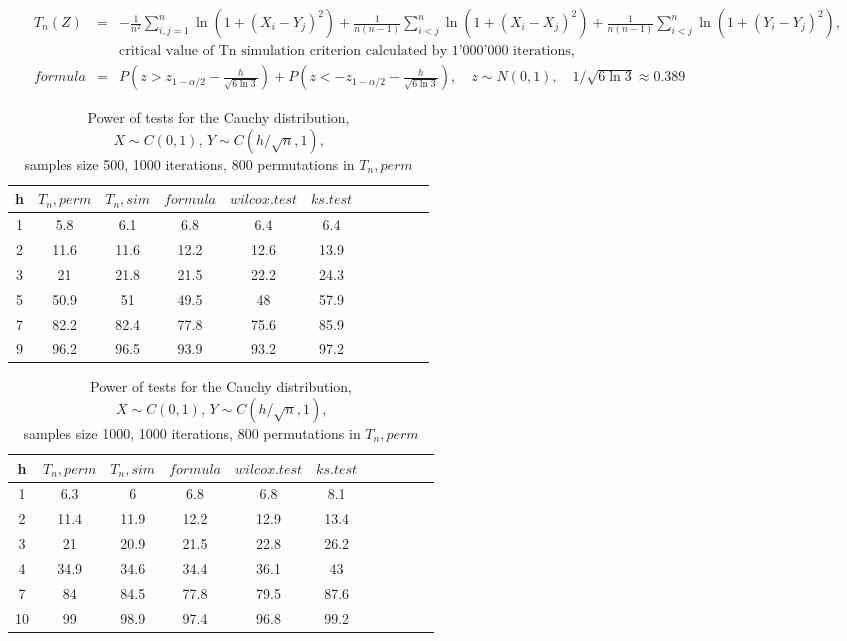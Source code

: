 \documentclass{report}
\begin{document}
\begin{eqnarray*}
  T_n(Z) &=& -\frac{1}{n^2}\sum_{i,j=1}^n\ln(1+(X_i-Y_j)^2)+\frac{1}{n(n-1)}\sum_{i<j}^n\ln(1+(X_i-X_j)^2)+\frac{1}{n(n-1)}\sum_{i<j}^n\ln(1+(Y_i-Y_j)^2),\\
  && \text{critical value of Tn simulation criterion calculated by 1'000'000 iterations}, \\
  formula &=& P(z > z_{1-\alpha/2} - \frac{h}{\sqrt{6\ln 3}}) + P(z < -z_{1-\alpha/2} - \frac{h}{\sqrt{6\ln 3}}),\quad z\sim N(0,1),\quad 1/\sqrt{6\ln 3}\approx 0.389
\end{eqnarray*}

\begin{longtable}{|c|c|c|c|c|c|c|c|c|c|c|}
  \caption{Power of tests for the Cauchy distribution, \\
           $X\sim C(0,1)$, $Y\sim C(h/\sqrt{n},1)$, \\
           samples size 500, 1000 iterations, 800 permutations in $T_n, perm$} \\
  \hline
  h & $T_n, perm$ & $T_n, sim$ & $formula$ & $wilcox.test$ & $ks.test$ \\ \hline
  1 & 5.8   & 6.1      & 6.8       & 6.4           & 6.4       \\
  2 & 11.6  & 11.6     & 12.2      & 12.6          & 13.9      \\
  3 & 21    & 21.8     & 21.5      & 22.2          & 24.3      \\
  5 & 50.9  & 51       & 49.5      & 48            & 57.9      \\
  7 & 82.2  & 82.4     & 77.8      & 75.6          & 85.9      \\
  9 & 96.2  & 96.5     & 93.9      & 93.2          & 97.2      \\ \hline
\end{longtable}

\begin{longtable}{|c|c|c|c|c|c|c|c|c|c|c|}
  \caption{Power of tests for the Cauchy distribution, \\
           $X\sim C(0,1)$, $Y\sim C(h/\sqrt{n},1)$, \\
           samples size 1000, 1000 iterations, 800 permutations in $T_n, perm$} \\
  \hline
  h  & $T_n, perm$ & $T_n, sim$ & $formula$ & $wilcox.test$ & $ks.test$ \\ \hline
  1  & 6.3   & 6        & 6.8       & 6.8           & 8.1       \\
  2  & 11.4  & 11.9     & 12.2      & 12.9          & 13.4      \\
  3  & 21    & 20.9     & 21.5      & 22.8          & 26.2      \\
  4  & 34.9  & 34.6     & 34.4      & 36.1          & 43        \\
  7  & 84    & 84.5     & 77.8      & 79.5          & 87.6      \\
  10 & 99    & 98.9     & 97.4      & 96.8          & 99.2      \\ \hline
\end{longtable}
\end{document}
